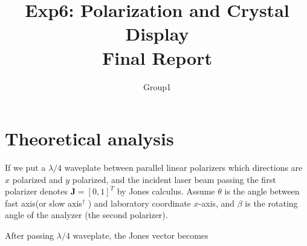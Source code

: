 \documentclass[12pt]{article}
\title{Exp6: Polarization and Crystal Display\\
Final Report}
\author{Group1}
\begin{document}
\maketitle

\section*{Theoretical analysis}

If we put a $ \lambda /4$   waveplate between parallel linear polarizers which directions are $ x $ polarized and $ y $ polarized, and the incident laser beam  passing the first polarizer denotes $ \mathbf{J}=[0,1]^T $ by Jones calculus. Assume $ \theta $ is the angle between fast axis(or slow axis$^\dag$ ) and laboratory coordinate $ x $-axis, and $ \beta $ is the rotating angle of the analyzer (the second polarizer).

After passing $ \lambda /4$   waveplate, the Jones vector becomes
\end{document}

